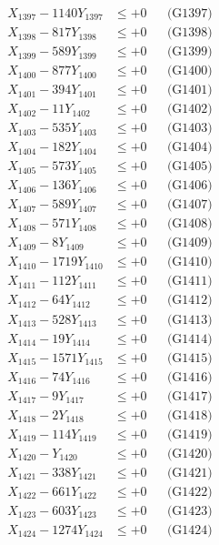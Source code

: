 \documentclass[a4paper,10pt]{article}
\begin{document}
{\begin{align}
X_{1397} - 1140Y_{1397} &\leq +0 && \text{(G1397)} \\
X_{1398} - 817Y_{1398} &\leq +0 && \text{(G1398)} \\
X_{1399} - 589Y_{1399} &\leq +0 && \text{(G1399)} \\
X_{1400} - 877Y_{1400} &\leq +0 && \text{(G1400)} \\
\allowbreak
X_{1401} - 394Y_{1401} &\leq +0 && \text{(G1401)} \\
X_{1402} - 11Y_{1402} &\leq +0 && \text{(G1402)} \\
X_{1403} - 535Y_{1403} &\leq +0 && \text{(G1403)} \\
X_{1404} - 182Y_{1404} &\leq +0 && \text{(G1404)} \\
X_{1405} - 573Y_{1405} &\leq +0 && \text{(G1405)} \\
X_{1406} - 136Y_{1406} &\leq +0 && \text{(G1406)} \\
X_{1407} - 589Y_{1407} &\leq +0 && \text{(G1407)} \\
X_{1408} - 571Y_{1408} &\leq +0 && \text{(G1408)} \\
X_{1409} - 8Y_{1409} &\leq +0 && \text{(G1409)} \\
X_{1410} - 1719Y_{1410} &\leq +0 && \text{(G1410)} \\
\allowbreak
X_{1411} - 112Y_{1411} &\leq +0 && \text{(G1411)} \\
X_{1412} - 64Y_{1412} &\leq +0 && \text{(G1412)} \\
X_{1413} - 528Y_{1413} &\leq +0 && \text{(G1413)} \\
X_{1414} - 19Y_{1414} &\leq +0 && \text{(G1414)} \\
X_{1415} - 1571Y_{1415} &\leq +0 && \text{(G1415)} \\
X_{1416} - 74Y_{1416} &\leq +0 && \text{(G1416)} \\
X_{1417} - 9Y_{1417} &\leq +0 && \text{(G1417)} \\
X_{1418} - 2Y_{1418} &\leq +0 && \text{(G1418)} \\
X_{1419} - 114Y_{1419} &\leq +0 && \text{(G1419)} \\
X_{1420} - Y_{1420} &\leq +0 && \text{(G1420)} \\
\allowbreak
X_{1421} - 338Y_{1421} &\leq +0 && \text{(G1421)} \\
X_{1422} - 661Y_{1422} &\leq +0 && \text{(G1422)} \\
X_{1423} - 603Y_{1423} &\leq +0 && \text{(G1423)} \\
X_{1424} - 1274Y_{1424} &\leq +0 && \text{(G1424)} \\

\end{align}}
\end{document}
